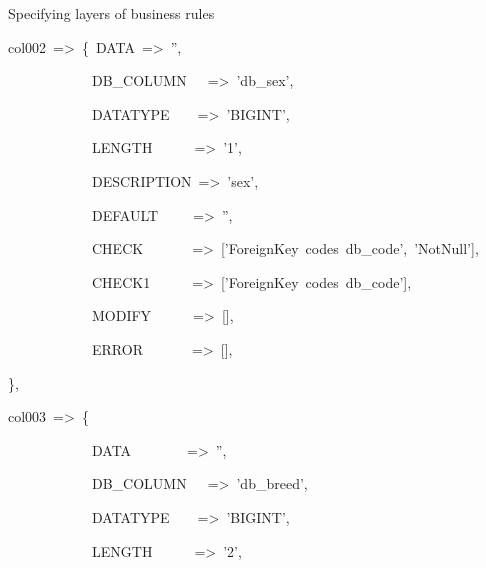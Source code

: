 \begin{table}[htbp]

\caption{\label{cap:check levels}Specifying layers of business rules}

\begin{lyxcode}
{\scriptsize col002~=>~\{~DATA~=>~'',~}{\scriptsize \par}

~{\scriptsize ~~~~~~~~~~~DB\_COLUMN~~~=>~'db\_sex',~}{\scriptsize \par}

~{\scriptsize ~~~~~~~~~~~DATATYPE~~~~=>~'BIGINT',~}{\scriptsize \par}

~{\scriptsize ~~~~~~~~~~~LENGTH~~~~~~=>~'1',~}{\scriptsize \par}

~{\scriptsize ~~~~~~~~~~~DESCRIPTION~=>~'sex',~}{\scriptsize \par}

~{\scriptsize ~~~~~~~~~~~DEFAULT~~~~~=>~'',~}{\scriptsize \par}

~{\scriptsize ~~~~~~~~~~~CHECK~~~~~~~=>~{[}'ForeignKey~codes~db\_code',~'NotNull'{]},~}{\scriptsize \par}

~{\scriptsize ~~~~~~~~~~~CHECK1~~~~~~=>~{[}'ForeignKey~codes~db\_code'{]},~}{\scriptsize \par}

~{\scriptsize ~~~~~~~~~~~MODIFY~~~~~~=>~{[}{]},~}{\scriptsize \par}

~{\scriptsize ~~~~~~~~~~~ERROR~~~~~~~=>~{[}{]},~}{\scriptsize \par}

{\scriptsize \},~}{\scriptsize \par}

{\scriptsize col003~=>~\{~~~~~~~~~~}{\scriptsize \par}

~{\scriptsize ~~~~~~~~~~~DATA~~~~~~~~=>~'',~~~~~~~~~~}{\scriptsize \par}

~{\scriptsize ~~~~~~~~~~~DB\_COLUMN~~~=>~'db\_breed',~~~~~~~~~~}{\scriptsize \par}

~{\scriptsize ~~~~~~~~~~~DATATYPE~~~~=>~'BIGINT',~~~~~~~~~~}{\scriptsize \par}

~{\scriptsize ~~~~~~~~~~~LENGTH~~~~~~=>~'2',~~~~~~~~~~}{\scriptsize \par}


\end{lyxcode}
\end{table}
